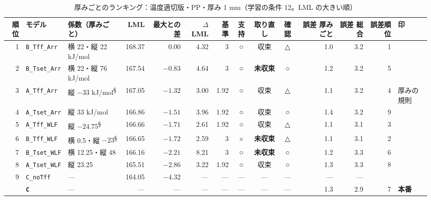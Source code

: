 \documentclass[paper=a4paper,landscape,fontsize=10pt,line_length=62zw,number_of_lines=34]{jlreq}
\let\origtextbf\textbf
\renewcommand{\textbf}[1]{\origtextbf{\gtfamily #1}}   %
\begin{document}
\begin{table}[H]\centering\footnotesize
\caption{厚みごとのランキング：温度適切版・PP・厚み 1 mm（学習の条件 12。LML の大きい順）}
\begin{tabular}{rlp{11\zw}rrrrccc rrrl}
\toprule
順位 & モデル & 係数（厚みごと） & LML & 最大との差 & $\Delta$LML & 基準 & 支持 & 取り直し & 確認 & 誤差 厚みごと & 誤差 総合 & 誤差順位 & 印 \\
\midrule
1 & \texttt{B\_\allowbreak{}Tff\_\allowbreak{}Arr} & 横 22・縦 22 kJ/mol & 168.37 & 0.00 & 4.32 & 3 & ○ & 収束 & △ & 1.0 & 3.2 & 1 &  \\
2 & \texttt{B\_\allowbreak{}Tset\_\allowbreak{}Arr} & 横 22・縦 76 kJ/mol & 167.54 & $-0.83$ & 4.64 & 3 & ○ & \textbf{未収束} & ○ & 1.2 & 3.2 & 5 &  \\
3 & \texttt{A\_\allowbreak{}Tff\_\allowbreak{}Arr} & 縦 $-33$ kJ/mol\textsuperscript{§} & 167.05 & $-1.32$ & 3.00 & 1.92 & ○ & 収束 & △ & 1.1 & 3.2 & 4 & 厚みの規則 \\
4 & \texttt{A\_\allowbreak{}Tset\_\allowbreak{}Arr} & 縦 33 kJ/mol & 166.86 & $-1.51$ & 3.96 & 1.92 & ○ & 収束 & ○ & 1.4 & 3.2 & 9 &  \\
5 & \texttt{A\_\allowbreak{}Tff\_\allowbreak{}WLF} & 縦 $-24.75$\textsuperscript{§} & 166.66 & $-1.71$ & 2.61 & 1.92 & ○ & 収束 & △ & 1.1 & 3.1 & 3 &  \\
6 & \texttt{B\_\allowbreak{}Tff\_\allowbreak{}WLF} & 横 0.5・縦 $-23$\textsuperscript{§} & 166.65 & $-1.72$ & 2.59 & 3 & × & \textbf{未収束} & △ & 1.1 & 3.1 & 2 &  \\
7 & \texttt{B\_\allowbreak{}Tset\_\allowbreak{}WLF} & 横 12.25・縦 48 & 166.16 & $-2.21$ & 8.21 & 3 & ○ & \textbf{未収束} & ○ & 1.2 & 3.3 & 6 &  \\
8 & \texttt{A\_\allowbreak{}Tset\_\allowbreak{}WLF} & 縦 23.25 & 165.51 & $-2.86$ & 3.22 & 1.92 & ○ & 収束 & ○ & 1.3 & 3.3 & 8 &  \\
9 & \texttt{C\_\allowbreak{}noTff} & --- & 164.05 & $-4.32$ & --- & --- & --- & --- & --- & --- & --- &  &  \\
 & \textbf{\texttt{C}} & --- & --- & --- & --- & --- & --- & --- & --- & 1.3 & 2.9 & 7 & \textbf{本番} \\
\bottomrule
\end{tabular}
\end{table}
\end{document}
